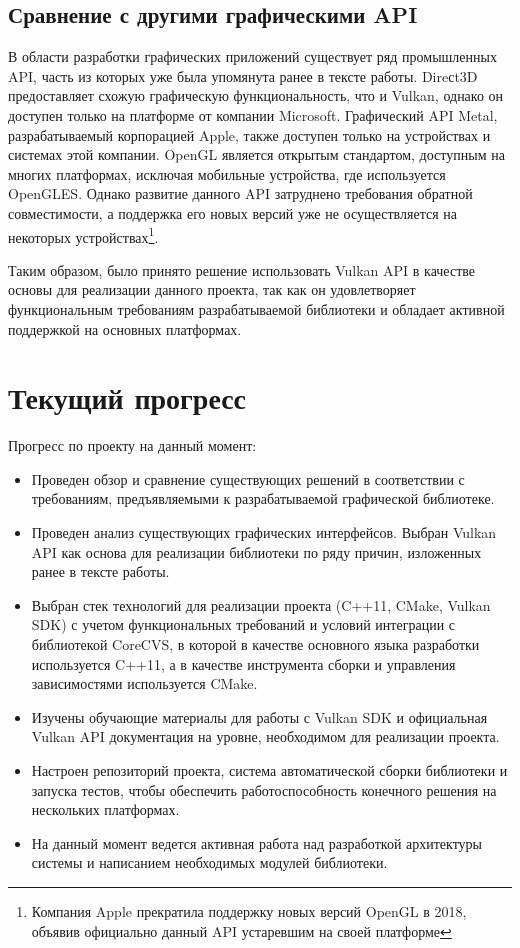 \documentclass[14pt]{matmex-diploma}
\begin{document}
\subsection{Сравнение с другими графическими API}

В области разработки графических приложений существует ряд промышленных API, часть из которых уже была упомянута ранее в тексте работы. Direсt3D предоставляет схожую графическую функциональность, что и Vulkan, однако он доступен только на платформе от компании Microsoft. Графический API Metal, разрабатываемый корпорацией Apple, также доступен только на устройствах и системах этой компании. OpenGL является открытым стандартом, доступным на многих платформах, исключая мобильные устройства, где используется OpenGLES. Однако развитие данного API затруднено требования обратной совместимости, а поддержка его новых версий уже не осуществляется на некоторых устройствах\footnote{Компания Apple прекратила поддержку новых версий OpenGL в 2018, объявив официально данный API устаревшим на своей платформе}.       

Таким образом, было принято решение использовать Vulkan API в качестве основы для реализации данного проекта, так как он удовлетворяет функциональным требованиям разрабатываемой библиотеки и обладает активной поддержкой на основных платформах.


\section{Текущий прогресс}

Прогресс по проекту на данный момент:

\begin{itemize}
    \item Проведен обзор и сравнение существующих решений в соответствии с требованиям, предъявляемыми к разрабатываемой графической библиотеке. 
    \item Проведен анализ существующих графических интерфейсов. Выбран Vulkan API как основа для реализации библиотеки по ряду причин, изложенных ранее в тексте работы.
    \item Выбран стек технологий для реализации проекта (C++11, CMake, Vulkan SDK) с учетом функциональных требований и условий интеграции с библиотекой CoreCVS, в которой в качестве основного языка разработки используется C++11, а в качестве инструмента сборки и управления зависимостями используется CMake. 
    \item Изучены обучающие материалы для работы с Vulkan SDK и официальная Vulkan API документация на уровне, необходимом для реализации проекта.
    \item Настроен репозиторий проекта, система автоматической сборки библиотеки и запуска тестов, чтобы обеспечить работоспособность конечного решения на нескольких платформах.
    \item На данный момент ведется активная работа над разработкой архитектуры системы и написанием необходимых модулей библиотеки.   
\end{itemize}
\end{document}
